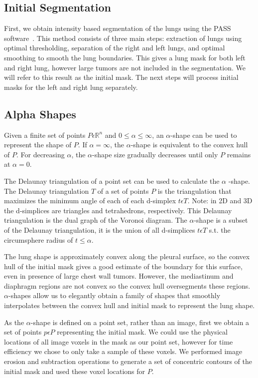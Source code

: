 \documentclass{llncs}
\begin{document}
\subsection{Initial Segmentation}
%

First, we obtain intensity based segmentation of the lungs using the PASS software~\cite{guo2008}. This method consists of three main steps: extraction of lungs using optimal thresholding, separation of the right and left lungs, and optimal smoothing to smooth the lung boundaries. This gives a lung mask for both left and right lung, however large tumors are not included in the segmentation. We will refer to this result as the initial mask. The next steps will process initial masks for the left and right lung separately. 
%
\subsection{Alpha Shapes}
%
 Given a finite set of points $P \epsilon \mathbb{R}^n$ and $ 0 \leq \alpha \leq \infty $, an $\alpha$-shape can be used to represent the shape of $P$. If $\alpha = \infty$, the $\alpha$-shape is equivalent to the convex hull of $P$. For decreasing $\alpha$, the $\alpha$-shape size gradually decreases until only $P$ remains at $\alpha=0$. 

The Delaunay triangulation of a point set can be used to calculate the $\alpha$ -shape.  The Delaunay triangulation $T$ of a set of points $P$ is the triangulation that maximizes the minimum angle of each of each d-simplex $t \epsilon T$. Note: in 2D and 3D the d-simplices are triangles and tetrahedrons, respectively. This Delaunay triangulation is the dual graph of the Voronoi diagram. The $\alpha$-shape is a subset of the Delaunay triangulation, it is the union of all d-simplices $t \epsilon T$ s.t. the circumsphere radius of $t \leq \alpha$. 

The lung shape is approximately convex along the pleural surface, so the convex hull of the initial mask gives a good estimate of the boundary for this surface, even in presence of large chest wall tumors. However, the mediastinum and diaphragm regions are not convex so the convex hull oversegments these regions. $\alpha$-shapes allow us to elegantly obtain a family of shapes that smoothly interpolates between the convex hull and initial mask to represent the lung shape. 


As the $\alpha$-shape is defined on a point set, rather than an image, first we obtain a set of points $p \epsilon P$ representing the initial mask. We could use the physical locations of all image voxels in the mask as our point set, however for time efficiency we chose to only take a sample of these voxels. We performed image erosion and subtraction operations to generate a set of concentric contours of the initial mask and used these voxel locations for $P$. 
\end{document}
